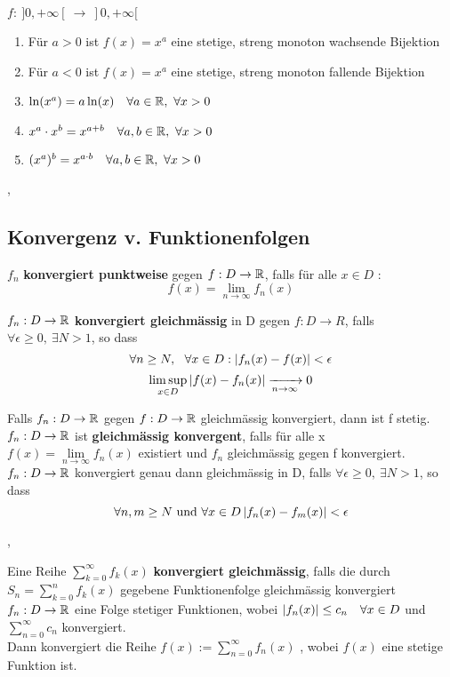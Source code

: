 \Korollar[3.6.6] $f : \ ]0, + \infty[ \ \rightarrow \  ]0, + \infty[$
\begin{enumerate}
\item Für $a > 0$ ist $f(x) = x^a$ eine stetige, streng monoton wachsende Bijektion
\item Für $a < 0$ ist $f(x) = x^a$ eine stetige, streng monoton fallende Bijektion
\item $\ln(x^a) = a \ln(x) \quad \forall a \in \mathbb{R}, \ \forall x > 0$
\item $x^a \cdot x^b = x^{a + b} \quad \forall a, b \in \mathbb{R}, \ \forall x > 0$
\item $(x^a)^b = x^{a \cdot b} \quad \forall a, b \in \mathbb{R}, \ \forall x > 0$
\end{enumerate}

\sep

\subsection{Konvergenz v. Funktionenfolgen}

\Def[3.7.1] $f_n$ \textbf{konvergiert punktweise} gegen ${f : D \rightarrow \mathbb{R}}$, falls für alle $x \in D$ :
\[f(x) =  \lim\limits_{n \rightarrow \infty} f_n(x) \]
 
\Def[3.7.3] $f_n : D \rightarrow \mathbb{R}$ \textbf{konvergiert gleichmässig} in D gegen $f : D \rightarrow R$, falls $ \forall \epsilon \geq 0, \ \exists N > 1$, so dass
\[\forall n \geq N, \ \ \forall x \in D : \left\lvert f_n(x) - f(x) \right\rvert < \epsilon \]
\[\limsup \limits_{x \in D} \left\lvert f(x) - f_n(x)  \right\rvert \xrightarrow[n \rightarrow \infty]{} 0 \]

\Satz[3.7.4] Falls $f_n : D \rightarrow \mathbb{R}$ gegen $f : D \rightarrow \mathbb{R}$ gleichmässig konvergiert, dann ist f stetig. \\

\Satz[3.7.5] $f_n : D \rightarrow \mathbb{R}$ ist \textbf{gleichmässig konvergent}, falls für alle x $f(x) = \lim\limits_{n \rightarrow \infty} f_n(x)$ existiert
und $f_n$ gleichmässig gegen f konvergiert. \\

\Korollar[3.7.6] $f_n : D \rightarrow \mathbb{R}$ konvergiert genau dann gleichmässig in D, falls $ \forall \epsilon \geq 0, \ \exists N > 1$, so dass
\[\forall n, m \geq N \text{ und } \forall x \in D \left\lvert f_n(x) - f_m(x) \right\rvert < \epsilon \]

\sep 

\Def[3.7.8] Eine Reihe $\sum_{k=0}^{\infty} f_k (x)$ \textbf{konvergiert gleichmässig}, falls die durch ${S_n = \sum_{k=0}^{n} f_k (x)}$ gegebene Funktionenfolge gleichmässig konvergiert \\

\Def[3.7.9] $f_n :  D \rightarrow \mathbb{R}$ eine Folge stetiger Funktionen, wobei $\left\lvert f_n (x) \right\rvert \leq c_n \quad \forall x \in D$ und $\sum_{n=0}^\infty c_n$ konvergiert. \\ Dann konvergiert die Reihe $f(x) := \sum_{n=0}^\infty f_n(x)$ , wobei $f(x)$ eine stetige Funktion ist. 